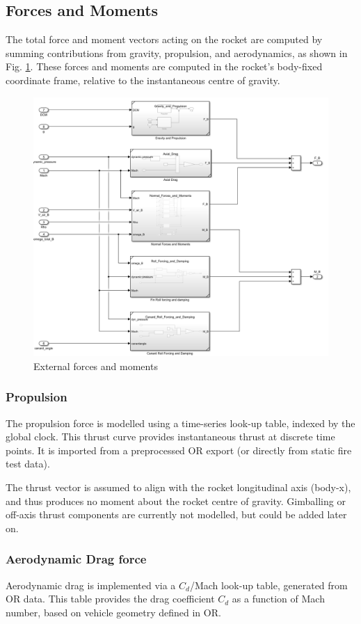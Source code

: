 \subsection{Forces and Moments}
The total force and moment vectors acting on the rocket are computed by summing contributions from gravity, propulsion, and aerodynamics, as shown in Fig. \ref{fig:sim-forces}.
These forces and moments are computed in the rocket’s body-fixed coordinate frame, relative to the instantaneous centre of gravity.

\begin{figure}[ht]
    \centering
    \includegraphics[width=0.5\linewidth]{images-plant/sim_forces.png}
    \caption{External forces and moments}
    \label{fig:sim-forces}
\end{figure}

\subsubsection{Propulsion}
The propulsion force is modelled using a time-series look-up table, indexed by the global clock. 
This thrust curve provides instantaneous thrust at discrete time points.
It is imported from a preprocessed OR export (or directly from static fire test data).

The thrust vector is assumed to align with the rocket longitudinal axis (body-x), and thus produces no moment about the rocket centre of gravity.
Gimballing or off-axis thrust components are currently not modelled, but could be added later on. 

\subsubsection{Aerodynamic Drag force}

Aerodynamic drag is implemented via a $C_d$/Mach look-up table, generated from OR data. 
This table provides the drag coefficient $C_d$ as a function of Mach number, based on vehicle geometry defined in OR.

